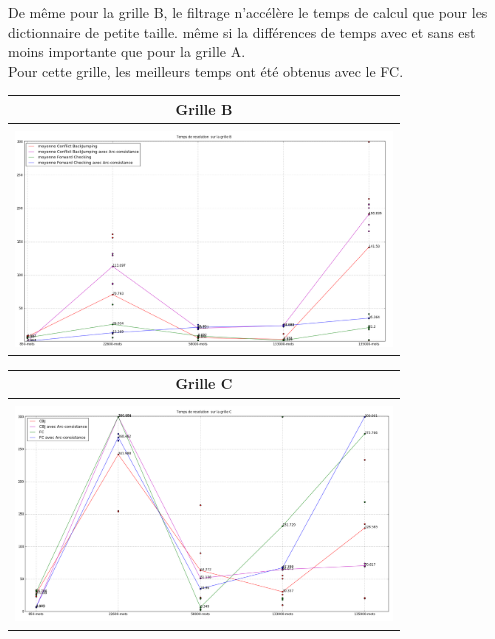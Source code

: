 \documentclass[a4paper,12pt]{report}
\begin{document}
\begin{enumerate}
\begin{table}[!h]
\begin{center}
\begin{tabular}{|c|}
\end{tabular}
\end{center}
\end{table}

De même pour la grille B, le filtrage n'accélère le temps de calcul que pour les dictionnaire de petite taille. même si la différences de temps avec et sans est moins importante que pour la grille A.\\

Pour cette grille, les meilleurs temps ont été obtenus avec le FC.\\

\begin{table}[!h]
\begin{center}
\begin{tabular}{|c|}

\hline
Grille B \\
\hline 
\\
\includegraphics[width=10cm]{Grille_B.png} \\
\hline


\end{tabular}
\end{center}
\end{table}


\begin{table}[!h]
\begin{center}
\begin{tabular}{|c|}

\hline
Grille C \\
\hline
\\
\includegraphics[width=10cm]{Grille_C.png}\\

\hline

\end{tabular}
\end{center}
\end{table}

\end{enumerate}
\end{document}
